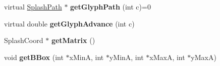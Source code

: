 \begin{DoxyCompactItemize}
\item 
\mbox{\label{class_splash_font_af37c29f59ec96958d25b00bb061499e1}} 
virtual \hyperlink{class_splash_path}{Splash\+Path} $\ast$ {\bfseries get\+Glyph\+Path} (int c)=0
\item 
\mbox{\label{class_splash_font_a73b9fd92bb61e5f329fdb7a1f34aa06c}} 
virtual double {\bfseries get\+Glyph\+Advance} (int c)
\item 
\mbox{\label{class_splash_font_ad0fd6e12583c1f35a2d19f1d08dbee01}} 
Splash\+Coord $\ast$ {\bfseries get\+Matrix} ()
\item 
\mbox{\label{class_splash_font_af4aa944f28d74f692a7f1262014fbbc7}} 
void {\bfseries get\+B\+Box} (int $\ast$x\+MinA, int $\ast$y\+MinA, int $\ast$x\+MaxA, int $\ast$y\+MaxA)
\end{DoxyCompactItemize}
